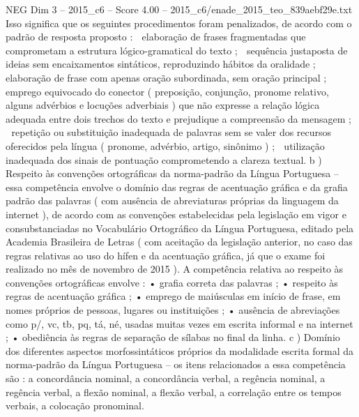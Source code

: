 \begin{textsample}{NEG Dim 3 – 2015\_c6 – Score 4.00 – 2015\_c6/enade\_2015\_teo\_839aebf29e.txt}
Isso significa que os seguintes procedimentos foram penalizados, de acordo com o padrão de resposta proposto :  elaboração de frases fragmentadas que comprometam a estrutura lógico-gramatical do texto ;  sequência justaposta de ideias sem encaixamentos sintáticos, reproduzindo hábitos da oralidade ;  elaboração de frase com apenas oração subordinada, sem oração principal ;  emprego equivocado do conector ( preposição, conjunção, pronome relativo, alguns advérbios e locuções adverbiais ) que não expresse a relação lógica adequada entre dois trechos do texto e prejudique a compreensão da mensagem ;  repetição ou substituição inadequada de palavras sem se valer dos recursos oferecidos pela língua ( pronome, advérbio, artigo, sinônimo ) ;  utilização inadequada dos sinais de pontuação comprometendo a clareza textual. b ) Respeito às convenções ortográficas da norma-padrão da Língua Portuguesa – essa competência envolve o domínio das regras de acentuação gráfica e da grafia padrão das palavras ( com ausência de abreviaturas próprias da linguagem da internet ), de acordo com as convenções estabelecidas pela legislação em vigor e consubstanciadas no Vocabulário Ortográfico da Língua Portuguesa, editado pela Academia Brasileira de Letras ( com aceitação da legislação anterior, no caso das regras relativas ao uso do hífen e da acentuação gráfica, já que o exame foi realizado no mês de novembro de 2015 ).
A competência relativa ao respeito às convenções ortográficas envolve : • grafia correta das palavras ; • respeito às regras de acentuação gráfica ; • emprego de maiúsculas em início de frase, em nomes próprios de pessoas, lugares ou instituições ; • ausência de abreviações como p/, vc, tb, pq, tá, né, usadas muitas vezes em escrita informal e na internet ; • obediência às regras de separação de sílabas no final da linha. c ) Domínio dos diferentes aspectos morfossintáticos próprios da modalidade escrita formal da norma-padrão da Língua Portuguesa – os itens relacionados a essa competência são : a concordância nominal, a concordância verbal, a regência nominal, a regência verbal, a flexão nominal, a flexão verbal, a correlação entre os tempos verbais, a colocação pronominal.

\end{textsample}
